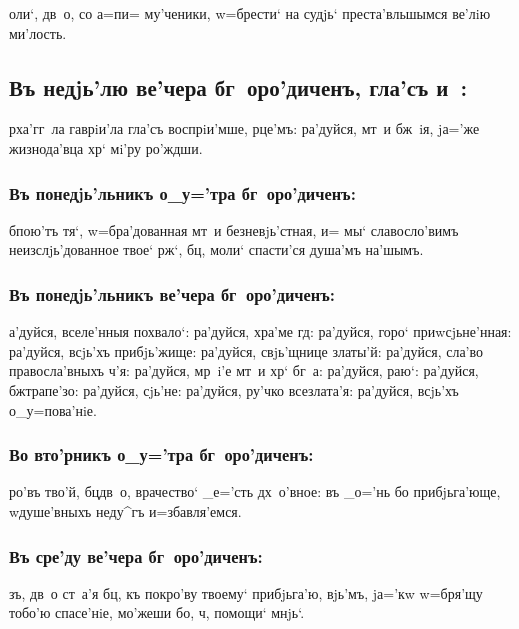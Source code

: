 \documentclass[14pt,twoside]{extreport}
\renewcommand{\*}{~~\raise3pt\hbox{\footnotesize*}}
\begin{document}
оли`, дв~о, со а=п и= му'ченики, w=брести` на судjь`
преста'вльшымся ве'лiю ми'лость.

\delimpict

\subsection[Гла'съ и~]{Въ недjь'лю ве'чера бг~оро'диченъ, гла'съ и~:}

рха'гг~ла гаврiи'ла гла'съ воспрiи'мше, рце'мъ: ра'дуйся, мт~и бж~iя,
jа='же жизнода'вца хр` мi'ру ро'ждши.

\subsubsection{Въ понедjь'льникъ о_у='тра бг~оро'диченъ:}

б пою'тъ тя`, w=бра'дованная мт~и безневjь'стная, и= мы`
славосло'вимъ неизслjь'дованное твое` рж`, бц, моли` спасти'ся душа'мъ
на'шымъ.

\subsubsection{Въ понедjь'льникъ ве'чера бг~оро'диченъ:}

а'дуйся, вселе'нныя похвало`: ра'дуйся, хра'ме гд: ра'дуйся, горо`
приwсjьне'нная: ра'дуйся, всjь'хъ прибjь'жище: ра'дуйся, свjь'щнице зла\-ты'й:
ра'дуйся, сла'во правосла'вныхъ ч'я: ра'дуйся, мр~i'е мт~и хр` бг~а:
ра'дуйся, раю`: ра'дуйся, бж трапе'зо: ра'дуйся, сjь'не: ра'дуйся,
ру'чко всезлата'я: ра'дуйся, всjь'хъ о_у=пова'нiе.

\subsubsection{Во вто'рникъ о_у='тра бг~оро'диченъ:}

ро'въ тво'й, бц дв~о, врачество` _е='сть дх~о'вное: въ _о='нь бо
прибjьга'юще, w\т душе'вныхъ неду^гъ и=збавля'емся.

\subsubsection{Въ сре'ду ве'чера бг~оро'диченъ:}

зъ, дв~о ст~а'я бц, къ покро'ву твоему` прибjьга'ю, вjь'мъ,
jа='кw w=бря'щу тобо'ю спасе'нiе, мо'\-же\-ши бо, ч, помощи` мнjь`.
\end{document}
